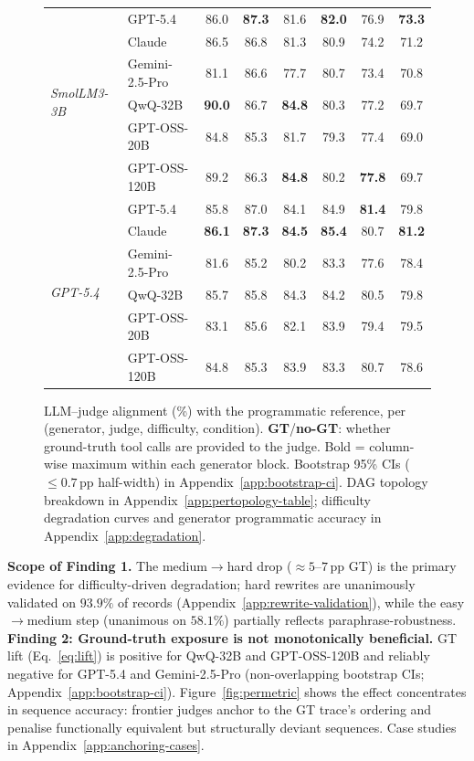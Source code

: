 \begin{figure}[!htbp]
{\begin{tabular}{@{}ll cc cc cc@{}}
  \multirow{6}{*}{\textit{SmolLM3-3B}}
    & GPT-5.4        & 86.0 & \textbf{87.3} & 81.6 & \textbf{82.0} & 76.9 & \textbf{73.3} \\
    & Claude         & 86.5 & 86.8 & 81.3 & 80.9 & 74.2 & 71.2 \\
    & Gemini-2.5-Pro & 81.1 & 86.6 & 77.7 & 80.7 & 73.4 & 70.8 \\
    & QwQ-32B        & \textbf{90.0} & 86.7 & \textbf{84.8} & 80.3 & 77.2 & 69.7 \\
    & GPT-OSS-20B    & 84.8 & 85.3 & 81.7 & 79.3 & 77.4 & 69.0 \\
    & GPT-OSS-120B   & 89.2 & 86.3 & \textbf{84.8} & 80.2 & \textbf{77.8} & 69.7 \\
  \midrule

  \multirow{6}{*}{\textit{GPT-5.4}}
    & GPT-5.4        & 85.8 & 87.0 & 84.1 & 84.9 & \textbf{81.4} & 79.8 \\
    & Claude         & \textbf{86.1} & \textbf{87.3} & \textbf{84.5} & \textbf{85.4} & 80.7 & \textbf{81.2} \\
    & Gemini-2.5-Pro & 81.6 & 85.2 & 80.2 & 83.3 & 77.6 & 78.4 \\
    & QwQ-32B        & 85.7 & 85.8 & 84.3 & 84.2 & 80.5 & 79.8 \\
    & GPT-OSS-20B    & 83.1 & 85.6 & 82.1 & 83.9 & 79.4 & 79.5 \\
    & GPT-OSS-120B   & 84.8 & 85.3 & 83.9 & 83.3 & 80.7 & 78.6 \\
  \bottomrule
  \end{tabular}%
  }
\caption{LLM–judge alignment (\%) with the programmatic reference, per (generator, judge, difficulty, condition). \textbf{GT}/\textbf{no-GT}: whether ground-truth tool calls are provided to the judge. Bold = column-wise maximum within each generator block. Bootstrap 95\% CIs (${\leq}0.7$\,pp half-width) in Appendix~\ref{app:bootstrap-ci}. DAG topology breakdown in Appendix~\ref{app:pertopology-table}; difficulty degradation curves and generator programmatic accuracy in Appendix~\ref{app:degradation}.}
\label{fig:full-results}

\end{figure}

\textbf{Scope of Finding 1.} The medium$\to$hard drop (${\approx}5$--$7$\,pp GT) is the primary evidence for difficulty-driven degradation; hard rewrites are unanimously validated on $93.9\%$ of records (Appendix~\ref{app:rewrite-validation}), while the easy$\to$medium step (unanimous on $58.1\%$) partially reflects paraphrase-robustness. \\
\textbf{Finding 2: Ground-truth exposure is not monotonically beneficial.} GT lift (Eq.~\ref{eq:lift}) is positive for QwQ-32B and GPT-OSS-120B and reliably negative for GPT-5.4 and Gemini-2.5-Pro (non-overlapping bootstrap CIs; Appendix~\ref{app:bootstrap-ci}). Figure~\ref{fig:permetric} shows the effect concentrates in sequence accuracy: frontier judges anchor to the GT trace's ordering and penalise functionally equivalent but structurally deviant sequences. Case studies in Appendix~\ref{app:anchoring-cases}.

